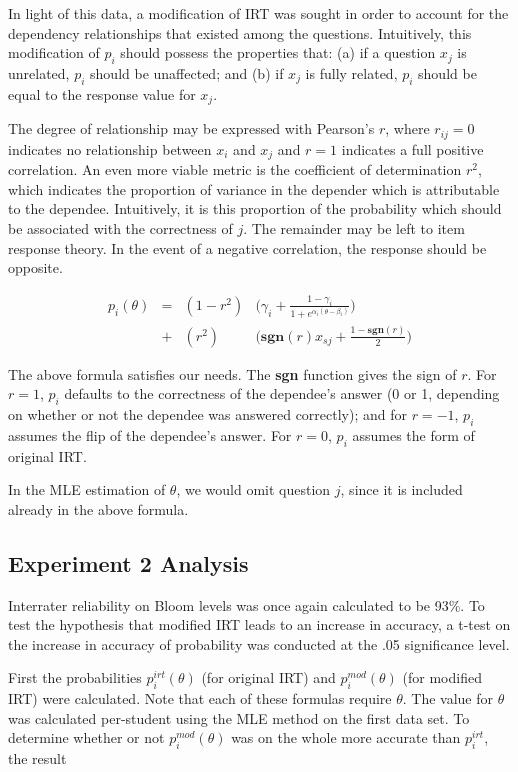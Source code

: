 In light of this data, a modification of IRT was sought in order to account for
the dependency relationships that existed among the questions.  Intuitively,
this modification of $p_i$ should possess the properties that: (a) if a
question $x_j$ is unrelated, $p_i$ should be unaffected; and (b) if $x_j$ is
fully related, $p_i$ should be equal to the response value for $x_j$. 

The degree of relationship may be expressed with Pearson's $r$, where
$r_{ij}=0$ indicates no relationship between $x_i$ and $x_j$ and $r=1$
indicates a full positive correlation.  An even more viable metric is the
coefficient of determination $r^2$, which indicates the proportion of variance
in the depender which is attributable to the dependee.  Intuitively, it is this
proportion of the probability which should be associated with the correctness
of $j$.  The remainder may be left to item response theory.  In the event of a
negative correlation, the response should be opposite.


\begin{align*}
  p_i(\theta) &=& (1-r^2) & \Big(\gamma_i + \frac{1-\gamma_i}{1+e^{\alpha_i(\theta-\beta_i)}}\Big) \\
              &+& (r^2)   & \Big(\mathbf{sgn}(r)x_{sj}+\frac{1-\mathbf{sgn}(r)}{2}\Big)
\end{align*}

The above formula satisfies our needs.  The \textbf{sgn} function gives the
sign of $r$.  For $r=1$, $p_i$ defaults to the correctness of the dependee's
answer (0 or 1, depending on whether or not the dependee was answered
correctly);  and for $r=-1$, $p_i$ assumes the flip of the dependee's answer.
For $r=0$, $p_i$ assumes the form of original IRT.  

In the MLE estimation of $\theta$, we would omit question $j$, since it is
included already in the above formula.


\subsection{Experiment 2 Analysis}

Interrater reliability on Bloom levels was once again calculated to be 93\%.
To test the hypothesis that modified IRT leads to an increase in accuracy, a
t-test on the increase in accuracy of probability was conducted at the .05
significance level.

First the probabilities $p_i^{irt}(\theta)$ (for original IRT) and
$p_i^{mod}(\theta)$ (for modified IRT) were calculated.  Note that each of
these formulas require $\theta$. The value for $\theta$ was calculated
per-student using the MLE method on the first data set.  To determine whether
or not $p_i^{mod}(\theta)$ was on the whole more accurate than $p_i^{irt}$, the
result

